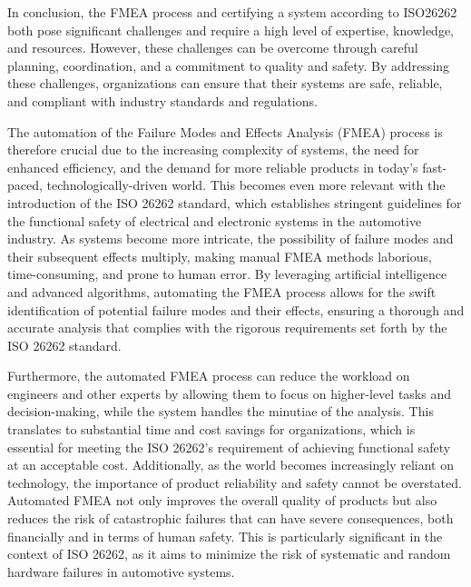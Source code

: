 \documentclass[./dissertation.tex]{subfiles}
\begin{document}

In conclusion, the FMEA process and certifying a system according to ISO26262 both pose significant challenges and require a high level of expertise, knowledge, and resources. However, these challenges can be overcome through careful planning, coordination, and a commitment to quality and safety. By addressing these challenges, organizations can ensure that their systems are safe, reliable, and compliant with industry standards and regulations.

The automation of the Failure Modes and Effects Analysis (FMEA) process is therefore crucial due to the increasing complexity of systems, the need for enhanced efficiency, and the demand for more reliable products in today's fast-paced, technologically-driven world. This becomes even more relevant with the introduction of the ISO 26262 standard, which establishes stringent guidelines for the functional safety of electrical and electronic systems in the automotive industry. As systems become more intricate, the possibility of failure modes and their subsequent effects multiply, making manual FMEA methods laborious, time-consuming, and prone to human error. By leveraging artificial intelligence and advanced algorithms, automating the FMEA process allows for the swift identification of potential failure modes and their effects, ensuring a thorough and accurate analysis that complies with the rigorous requirements set forth by the ISO 26262 standard.

Furthermore, the automated FMEA process can reduce the workload on engineers and other experts by allowing them to focus on higher-level tasks and decision-making, while the system handles the minutiae of the analysis. This translates to substantial time and cost savings for organizations, which is essential for meeting the ISO 26262's requirement of achieving functional safety at an acceptable cost. Additionally, as the world becomes increasingly reliant on technology, the importance of product reliability and safety cannot be overstated. Automated FMEA not only improves the overall quality of products but also reduces the risk of catastrophic failures that can have severe consequences, both financially and in terms of human safety. This is particularly significant in the context of ISO 26262, as it aims to minimize the risk of systematic and random hardware failures in automotive systems.
\end{document}
